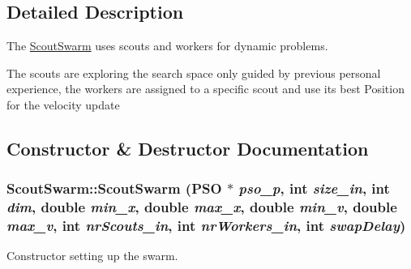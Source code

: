 \subsection{Detailed Description}
The \hyperlink{classScoutSwarm}{ScoutSwarm} uses scouts and workers for dynamic problems. 

The scouts are exploring the search space only guided by previous personal experience, the workers are assigned to a specific scout and use its best Position for the velocity update 

\subsection{Constructor \& Destructor Documentation}
\hypertarget{classScoutSwarm_2698fea9f0ae474d43aee1c246235ed3}{
\subsubsection{\setlength{\rightskip}{0pt plus 5cm}ScoutSwarm::ScoutSwarm ({\bf PSO} $\ast$ {\em pso\_\-p}, \/  int {\em size\_\-in}, \/  int {\em dim}, \/  double {\em min\_\-x}, \/  double {\em max\_\-x}, \/  double {\em min\_\-v}, \/  double {\em max\_\-v}, \/  int {\em nrScouts\_\-in}, \/  int {\em nrWorkers\_\-in}, \/  int {\em swapDelay})}}
\label{classScoutSwarm_2698fea9f0ae474d43aee1c246235ed3}


Constructor setting up the swarm. 

